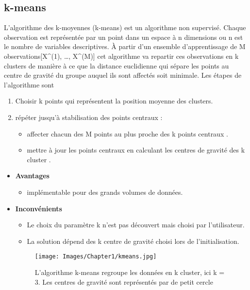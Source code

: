 \subsection{k-means}
L’algorithme des k-moyennes (k-means) est un algorithme non supervisé. Chaque observation est représentée par un point dans un espace à n dimensions ou n est le nombre de variables descriptives.
À partir d’un ensemble d’apprentissage de M observations[X^{(1)}, \ldots, X^{(M)}] cet algorithme va repartir ces observations en k clusters de manière à ce que la distance euclidienne qui sépare les points au centre de gravité du groupe auquel ils sont affectés soit minimale. Les étapes de l’algorithme sont 
\begin{enumerate}
    \item Choisir k points qui représentent la position moyenne des clusters.
    \item répéter jusqu’à stabilisation des points centraux :
    \begin{itemize}
        \item affecter chacun des M points au plus proche des k points centraux .
        \item mettre à jour les points centraux en calculant les centres de gravité des k cluster .
    \end{itemize}
\end{enumerate}
\begin{itemize}
    \item \textbf{Avantages}
    \begin{itemize}
        \item implémentable pour des grands volumes de données.
    \end{itemize}
    \item \textbf{Inconvénients}
    \begin{itemize}
        \item Le choix du paramètre k n’est pas découvert mais choisi par l’utilisateur.
        \item La solution dépend des k centre de gravité choisi lors de l’initialisation.
    \end{itemize}
    \begin{figure}[h]
        \centering
        \texttt{[image: Images/Chapter1/kmeans.jpg]}
        \caption{L’algorithme k-means regroupe les données en k cluster, ici k = 3. Les centres de gravité sont représentés par de petit cercle}
        \label{fig:03}
        \end{figure}    
\end{itemize}
